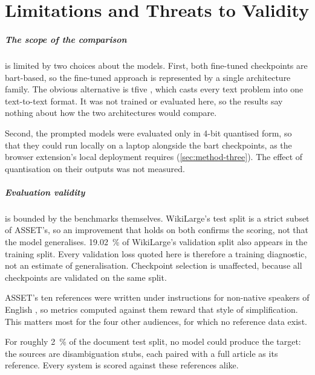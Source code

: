 \chapter{Limitations and Threats to Validity}
\label{sec:limitations}

\paragraph{The scope of the comparison} is limited by two choices about the models.
First, both fine-tuned checkpoints are \gls{bart}-based, so the fine-tuned approach is represented by a single architecture family.
The obvious alternative is \gls{tfive} \parencite[1]{raffel2023exploringlimitstransferlearning}, which casts every text problem into one text-to-text format.
It was not trained or evaluated here, so the results say nothing about how the two architectures would compare.

Second, the prompted models were evaluated only in 4-bit quantised form, so that they could run locally on a laptop alongside the \gls{bart} checkpoints, as the browser extension's local deployment requires (\cref{sec:method-three}).
The effect of quantisation on their outputs was not measured.

\paragraph{Evaluation validity} is bounded by the benchmarks themselves.
WikiLarge's test split is a strict subset of ASSET's, so an improvement that holds on both confirms the scoring, not that the model generalises.
\qty{19.02}{\percent} of WikiLarge's validation split also appears in the training split.
Every validation loss quoted here is therefore a training diagnostic, not an estimate of generalisation.
Checkpoint selection is unaffected, because all checkpoints are validated on the same split.

ASSET's ten references were written under instructions for non-native speakers of English \parencite[13294]{kew-etal-2023-bless}, so metrics computed against them reward that style of simplification.
This matters most for the four other audiences, for which no reference data exist.

For roughly \qty{2}{\percent} of the document test split, no model could produce the target: the sources are disambiguation stubs, each paired with a full article as its reference.
Every system is scored against these references alike.

